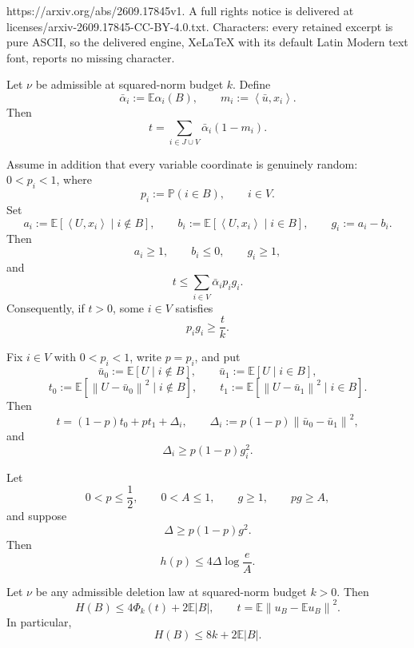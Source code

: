 \documentclass[10pt,a4paper]{amsart}
\newcommand{\E}{\mathbb E}
\newcommand{\Pp}{\mathbb P}
\newcommand{\ip}[2]{\left\langle #1,#2\right\rangle}
\newcommand{\norm}[1]{\left\lVert #1\right\rVert}
\begin{document}
https://arxiv.org/abs/2609.17845v1. A full rights notice is delivered at licenses/arxiv-2609.17845-CC-BY-4.0.txt. Characters: every retained excerpt is pure ASCII, so the delivered engine, XeLaTeX with its default Latin Modern text font, reports no missing character.
\begin{lemma}
\label{lem:covariance-identity}
Let \(\nu\) be admissible at squared-norm budget \(k\). Define
\[
 \bar\alpha_i:=\E\alpha_i(B),
 \qquad
 m_i:=\ip{\bar u}{x_i}.
\]
Then
\[
 \boxed{
 t=
 \sum_{i\in J\cup V}\bar\alpha_i(1-m_i).}
 \tag{3.1}
\]

Assume in addition that every variable coordinate is genuinely random:
\(0<p_i<1\), where
\[
 p_i:=\Pp(i\in B),
 \qquad
 i\in V.
\]
Set
\[
 a_i:=\E[\ip{U}{x_i}\mid i\notin B],
 \qquad
 b_i:=\E[\ip{U}{x_i}\mid i\in B],
 \qquad
 g_i:=a_i-b_i.
\]
Then
\[
 a_i\ge1,
 \qquad
 b_i\le0,
 \qquad
 g_i\ge1,
\]
and
\[
 \boxed{
 t\le
 \sum_{i\in V}\bar\alpha_i p_i g_i.}
 \tag{3.2}
\]
Consequently, if \(t>0\), some \(i\in V\) satisfies
\[
 \boxed{
 p_i g_i\ge\frac{t}{k}.}
 \tag{3.3}
\]
\end{lemma}

\begin{lemma}
\label{lem:variance-split}
Fix \(i\in V\) with \(0<p_i<1\), write \(p=p_i\), and put
\[
 \bar u_0:=\E[U\mid i\notin B],
 \qquad
 \bar u_1:=\E[U\mid i\in B],
\]
\[
 t_0:=
 \E[\norm{U-\bar u_0}^2\mid i\notin B],
 \qquad
 t_1:=
 \E[\norm{U-\bar u_1}^2\mid i\in B].
\]
Then
\[
 \boxed{
 t=(1-p)t_0+pt_1+\Delta_i,}
 \qquad
 \Delta_i:=
 p(1-p)\norm{\bar u_0-\bar u_1}^2,
 \tag{3.4}
\]
and
\[
 \boxed{
 \Delta_i\ge p(1-p)g_i^2.}
 \tag{3.5}
\]
\end{lemma}

\begin{lemma}
\label{lem:binary-payment}
Let
\[
 0<p\le\frac12,
 \qquad
 0<A\le1,
 \qquad
 g\ge1,
 \qquad
 pg\ge A,
\]
and suppose
\[
 \Delta\ge p(1-p)g^2.
\]
Then
\[
 \boxed{
 h(p)\le4\Delta\log\frac eA.}
 \tag{3.6}
\]
\end{lemma}

\begin{theorem}
\label{thm:entropy}
Let \(\nu\) be any admissible deletion law at squared-norm budget \(k>0\). Then
\[
 \boxed{
 H(B)
 \le
 4\Phi_k(t)+2\E|B|,}
 \qquad
 t=\E\norm{u_B-\E u_B}^2.
 \tag{3.10}
\]
In particular,
\[
 \boxed{
 H(B)\le8k+2\E|B|.}
 \tag{3.11}
\]
\end{theorem}
\end{document}
